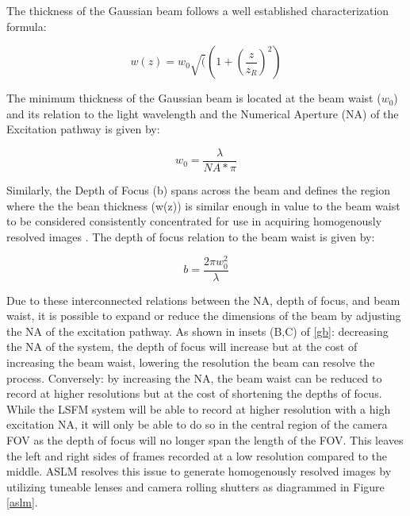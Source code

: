 The thickness of the Gaussian beam follows a well established characterization formula: 

\begin{equation}
w(z) = w_0 \sqrt((1+(\frac{z}{z_R})^2)
\end{equation}
\medskip

The minimum thickness of the Gaussian beam is located at the beam waist ($w_0$) and its relation to the light wavelength and the Numerical Aperture (NA) of the Excitation pathway is given by:

\begin{equation}
w_0 = \frac{\lambda}{NA*\pi}
\end{equation}
\medskip

Similarly, the Depth of Focus (b) spans across the beam and defines the region where the the bean thickness (w(z)) is similar enough in value to the beam waist to be considered consistently concentrated for use in acquiring homogenously resolved images \cite{paschotta_gaussian_2005}. The depth of focus relation to the beam waist is given by:

\begin{equation}
b = \frac{2\pi w_0^2}{\lambda}
\end{equation}
\medskip

Due to these interconnected relations between the NA, depth of focus, and beam waist, it is possible to expand or reduce the dimensions of the beam by adjusting the NA of the excitation pathway. As shown in insets (B,C) of \ref{gb}: decreasing the NA of the system, the depth of focus will increase but at the cost of increasing the beam waist, lowering the resolution the beam can resolve the process. Conversely: by increasing the NA, the beam waist can be reduced to record at higher resolutions but at the cost of shortening the depths of focus. While the LSFM system will be able to record at higher resolution with a high excitation NA, it will only be able to do so in the central region of the camera FOV as the depth of focus will no longer span the length of the FOV. This leaves the left and right sides of frames recorded at a low resolution compared to the middle. ASLM resolves this issue to generate homogenously resolved images by utilizing tuneable lenses and camera rolling shutters as diagrammed in Figure \ref{aslm}. 

